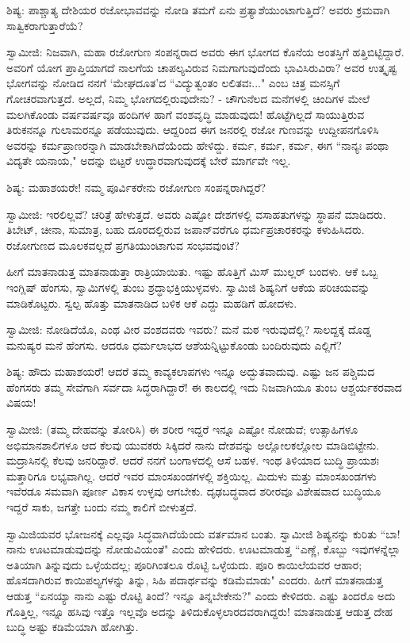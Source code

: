 ಶಿಷ್ಯ: ಪಾಶ್ಚಾತ್ಯ ದೇಶಿಯರ ರಜೋಭಾವವನ್ನು ನೋಡಿ ತಮಗೆ ಏನು ಪ್ರತ್ಯಾಶೆಯುಂಟಾಗುತ್ತಿದೆ? ಅವರು ಕ್ರಮವಾಗಿ ಸಾತ್ವಿಕರಾಗುತ್ತಾರೆಯೆ?

ಸ್ವಾಮೀಜಿ: ನಿಜವಾಗಿ, ಮಹಾ ರಜೋಗುಣ ಸಂಪನ್ನರಾದ ಅವರು ಈಗ ಭೋಗದ ಕೊನೆಯ ಅಂತಸ್ತಿಗೆ ಹತ್ತಿಬಿಟ್ಟಿದ್ದಾರೆ. ಅವರಿಗೆ ಯೋಗ ಪ್ರಾಪ್ತಿಯಾಗದೆ ನಾಲಗೆಯ ಚಾಪಲ್ಯವಿರುವ ನಿಮಗಾಗುವುದೆಂದು ಭಾವಿಸಿರುವಿರಾ? ಅವರ ಉತ್ಕೃಷ್ಟ ಭೋಗವನ್ನು ನೋಡಿದ ನನಗೆ ‘ಮೇಘದೂತ’ದ “ವಿದ್ಯುತ್ವಂತಂ ಲಲಿತವಃ..." ಎಂಬ ಚಿತ್ರ ಮನಸ್ಸಿಗೆ ಗೋಚರವಾಗುತ್ತದೆ. ಅಲ್ಲದೆ, ನಿಮ್ಮ ಭೋಗದಲ್ಲಿರುವುದೇನು? - ಚೌಗುನೆಲದ ಮನೆಗಳಲ್ಲಿ ಚಿಂದಿಗಳ ಮೇಲೆ ಮಲಗಿಕೊಂಡು ವರ್ಷವರ್ಷವೂ ಹಂದಿಗಳ ಹಾಗೆ ವಂಶವೃದ್ಧಿ ಮಾಡುವುದು! ಹೊಟ್ಟೆಗಿಲ್ಲದೆ ಸಾಯುತ್ತಿರುವ ತಿರುಕನನ್ನೂ ಗುಲಾಮರನ್ನೂ ಪಡೆಯುವುದು. ಆದ್ದರಿಂದ ಈಗ ಜನರಲ್ಲಿ ರಜೋ ಗುಣವನ್ನು ಉದ್ದೀಪನಗೊಳಿಸಿ ಅವರನ್ನು ಕರ್ಮಪ್ರಾಣರನ್ನಾಗಿ ಮಾಡಬೇಕಾಗಿದೆಯೆಂದು ಹೇಳಿದ್ದು. ಕರ್ಮ, ಕರ್ಮ, ಕರ್ಮ, ಈಗ “ನಾನ್ಯಃ ಪಂಥಾ ವಿದ್ಯತೇ ಯನಾಯ," ಅದನ್ನು ಬಿಟ್ಟರೆ ಉದ್ಧಾರವಾಗುವುದಕ್ಕೆ ಬೇರೆ ಮಾರ್ಗವೇ ಇಲ್ಲ.

ಶಿಷ್ಯ: ಮಹಾಶಯರೇ! ನಮ್ಮ ಪೂರ್ವಿಕರೇನು ರಜೋಗುಣ ಸಂಪನ್ನರಾಗಿದ್ದರೆ?

ಸ್ವಾಮೀಜಿ: ಇರಲಿಲ್ಲವೆ? ಚರಿತ್ರೆ ಹೇಳುತ್ತದೆ. ಅವರು ಎಷ್ಟೋ ದೇಶಗಳಲ್ಲಿ ವಸಾಹತುಗಳನ್ನು ಸ್ಥಾಪನೆ ಮಾಡಿದರು. ತಿಬೇಟ್, ಚೀನಾ, ಸುಮಾತ್ರ, ಬಹು ದೂರದಲ್ಲಿರುವ ಜಪಾನ್‌ವರೆಗೂ ಧರ್ಮಪ್ರಚಾರಕರನ್ನು ಕಳುಹಿಸಿದರು. ರಜೋಗುಣದ ಮೂಲಕವಲ್ಲದೆ ಪ್ರಗತಿಯುಂಟಾಗುವ ಸಂಭವವುಂಟೆ?

ಹೀಗೆ ಮಾತನಾಡುತ್ತ ಮಾತನಾಡುತ್ತಾ ರಾತ್ರಿಯಾಯಿತು. ಇಷ್ಟು ಹೊತ್ತಿಗೆ ಮಿಸ್ ಮುಲ್ಲರ್ ಬಂದಳು. ಆಕೆ ಒಬ್ಬ ಇಂಗ್ಲಿಷ್ ಹೆಂಗಸು, ಸ್ವಾಮಿಗಳಲ್ಲಿ ತುಂಬ ಶ್ರದ್ಧಾಭಕ್ತಿಯುಳ್ಳವಳು. ಸ್ವಾಮಿಜಿ ಶಿಷ್ಯನಿಗೆ ಆಕೆಯ ಪರಿಚಯವನ್ನು ಮಾಡಿಕೊಟ್ಟರು. ಸ್ವಲ್ಪ ಹೊತ್ತು ಮಾತನಾಡಿದ ಬಳಿಕ ಆಕೆ ಎದ್ದು ಮಹಡಿಗೆ ಹೋದಳು.

ಸ್ವಾಮೀಜಿ: ನೋಡಿದೆಯೊ, ಎಂಥ ವೀರ ವಂಶದವರು ಇವರು? ಮನೆ ಮಠ ಇರುವುದೆಲ್ಲಿ? ಸಾಲದ್ದಕ್ಕೆ ದೊಡ್ಡ ಮನುಷ್ಯರ ಮನೆ ಹೆಂಗಸು. ಆದರೂ ಧರ್ಮಲಾಭದ ಆಶೆಯನ್ನಿಟ್ಟುಕೊಂಡು ಬಂದಿರುವುದು ಎಲ್ಲಿಗೆ?

ಶಿಷ್ಯ: ಹೌದು ಮಹಾಶಯರೆ! ಆದರೆ ತಮ್ಮ ಕಾವ್ಯಕಲಾಪಗಳು ಇನ್ನೂ ಅದ್ಭುತವಾದುವು. ಎಷ್ಟು ಜನ ಪಶ್ಚಿಮದ ಹೆಂಗಸರು ತಮ್ಮ ಸೇವೆಗಾಗಿ ಸರ್ವದಾ ಸಿದ್ಧರಾಗಿದ್ದಾರೆ! ಈ ಕಾಲದಲ್ಲಿ ಇದು ನಿಜವಾಗಿಯೂ ತುಂಬ ಆಶ್ಚರ್ಯಕರವಾದ ವಿಷಯ!

ಸ್ವಾಮೀಜಿ: (ತಮ್ಮ ದೇಹವನ್ನು ತೋರಿಸಿ) ಈ ಶರೀರ ಇದ್ದರೆ ಇನ್ನೂ ಎಷ್ಟೋ ನೋಡುವೆ; ಉತ್ಸಾಹಿಗಳೂ ಅಭಿಮಾನಶಾಲಿಗಳೂ ಆದ ಕೆಲವು ಯುವಕರು ಸಿಕ್ಕಿದರೆ ನಾನು ದೇಶವನ್ನು ಅಲ್ಲೋಲಕಲ್ಲೋಲ ಮಾಡಿಬಿಟ್ಟೇನು. ಮದ್ರಾಸಿನಲ್ಲಿ ಕೆಲವು ಜನರಿದ್ದಾರೆ. ಆದರೆ ನನಗೆ ಬಂಗಾಳದಲ್ಲಿ ಆಸೆ ಬಹಳ. ಇಂಥ ತಿಳಿಯಾದ ಬುದ್ಧಿ ಪ್ರಾಯಶಃ ಮತ್ತಾರಿಗೂ ಲಭ್ಯವಾಗಿಲ್ಲ. ಆದರೆ ಇವರ ಮಾಂಸಖಂಡಗಳಲ್ಲಿ ಶಕ್ತಿಯಿಲ್ಲ. ಮಿದುಳು ಮತ್ತು ಮಾಂಸಖಂಡಗಳು ಇವೆರಡೂ ಸಮವಾಗಿ ಪೂರ್ಣ ವಿಕಾಸ ಉಳ್ಳವು ಆಗಬೇಕು. ದೃಢಬದ್ಧವಾದ ಶರೀರವೂ ವಿಶೇಷವಾದ ಬುದ್ಧಿಯೂ ಇದ್ದರೆ ಸಾಕು, ಜಗತ್ತೇ ಬಂದು ನಮ್ಮ ಕಾಲಿಗೆ ಬೀಳುತ್ತದೆ.

ಸ್ವಾಮಿಜಿಯವರ ಭೋಜನಕ್ಕೆ ಎಲ್ಲವೂ ಸಿದ್ಧವಾಗಿದೆಯೆಂದು ವರ್ತಮಾನ ಬಂತು. ಸ್ವಾಮೀಜಿ ಶಿಷ್ಯನನ್ನು ಕುರಿತು “ಬಾ! ನಾನು ಊಟಮಾಡುವುದನ್ನು ನೋಡುವಿಯಂತೆ" ಎಂದು ಹೇಳಿದರು. ಊಟಮಾಡುತ್ತ “ಎಣ್ಣೆ, ಕೊಬ್ಬು ಇವುಗಳನ್ನೆಲ್ಲಾ ಅತಿಯಾಗಿ ತಿನ್ನುವುದು ಒಳ್ಳೆಯದಲ್ಲ; ಪೂರಿಗಿಂತಲೂ ರೊಟ್ಟಿ ಒಳ್ಳೆಯದು. ಪೂರಿ ಕಾಯಿಲೆಯವರ ಆಹಾರ; ಹೊಸದಾಗಿರುವ ಕಾಯಿಪಲ್ಯಗಳನ್ನು ತಿನ್ನು, ಸಿಹಿ ಪದಾರ್ಥವನ್ನು ಕಡಿಮೆಮಾಡು" ಎಂದರು. ಹೀಗೆ ಮಾತನಾಡುತ್ತ ಆಡುತ್ತ “ಏನಯ್ಯಾ ನಾನು ಎಷ್ಟು ರೊಟ್ಟಿ ತಿಂದೆ? ಇನ್ನೂ ತಿನ್ನಬೇಕೇನು?" ಎಂದು ಕೇಳಿದರು. ಎಷ್ಟು ತಿಂದರೊ ಅದು ಗೊತ್ತಿಲ್ಲ, ಇನ್ನೂ ಹಸಿವು ಇತ್ತೊ ಇಲ್ಲವೊ ಅದನ್ನು ತಿಳಿದುಕೊಳ್ಳಲಾರದವರಾಗಿದ್ದರು! ಮಾತನಾಡುತ್ತ ಆಡುತ್ತ ದೇಹ ಬುದ್ಧಿ ಅಷ್ಟು ಕಡಿಮೆಯಾಗಿ ಹೋಗಿತ್ತು.

